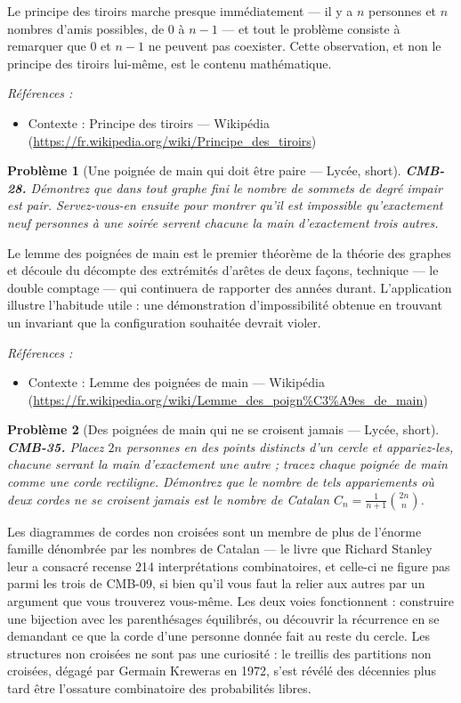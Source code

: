 \documentclass[11pt]{article}
\newtheorem{problem}{Problème}
\newenvironment{refs}{\par\small\noindent\emph{Références :}\begin{itemize}\setlength\itemsep{0pt}}{\end{itemize}\normalsize}
\begin{document}
\noindent Le principe des tiroirs marche presque immédiatement --- il y a $ n $ personnes et $ n $ nombres d'amis possibles, de $ 0 $ à $ n-1 $ --- et tout le problème consiste à remarquer que $ 0 $ et $ n-1 $ ne peuvent pas coexister. Cette observation, et non le principe des tiroirs lui-même, est le contenu mathématique.

\begin{refs}
\item Contexte : Principe des tiroirs --- Wikipédia (\url{https://fr.wikipedia.org/wiki/Principe_des_tiroirs})
\end{refs}

\bigskip

\begin{problem}[{Une poignée de main qui doit être paire --- Lycée, short}]
\textbf{CMB-28.} Démontrez que dans tout graphe fini le nombre de sommets de degré impair est pair. Servez-vous-en ensuite pour montrer qu'il est impossible qu'exactement neuf personnes à une soirée serrent chacune la main d'exactement trois autres.
\end{problem}

\noindent Le lemme des poignées de main est le premier théorème de la théorie des graphes et découle du décompte des extrémités d'arêtes de deux façons, technique --- le double comptage --- qui continuera de rapporter des années durant. L'application illustre l'habitude utile : une démonstration d'impossibilité obtenue en trouvant un invariant que la configuration souhaitée devrait violer.

\begin{refs}
\item Contexte : Lemme des poignées de main --- Wikipédia (\url{https://fr.wikipedia.org/wiki/Lemme_des_poign%C3%A9es_de_main})
\end{refs}

\bigskip

\begin{problem}[{Des poignées de main qui ne se croisent jamais --- Lycée, short}]
\textbf{CMB-35.} Placez $ 2n $ personnes en des points distincts d'un cercle et appariez-les, chacune serrant la main d'exactement une autre ; tracez chaque poignée de main comme une corde rectiligne. Démontrez que le nombre de tels appariements où deux cordes ne se croisent jamais est le nombre de Catalan $ C_n = \frac{1}{n+1}\binom{2n}{n} $.
\end{problem}

\noindent Les diagrammes de cordes non croisées sont un membre de plus de l'énorme famille dénombrée par les nombres de Catalan --- le livre que Richard Stanley leur a consacré recense 214 interprétations combinatoires, et celle-ci ne figure pas parmi les trois de CMB-09, si bien qu'il vous faut la relier aux autres par un argument que vous trouverez vous-même. Les deux voies fonctionnent : construire une bijection avec les parenthésages équilibrés, ou découvrir la récurrence en se demandant ce que la corde d'une personne donnée fait au reste du cercle. Les structures non croisées ne sont pas une curiosité : le treillis des partitions non croisées, dégagé par Germain Kreweras en 1972, s'est révélé des décennies plus tard être l'ossature combinatoire des probabilités libres.
\end{document}
